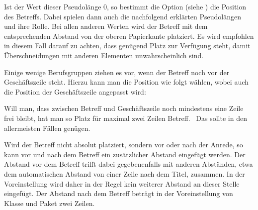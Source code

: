 \begin{Declaration}
\end{Declaration}
%
Ist der Wert dieser Pseudolänge 0, so bestimmt die
Option
%
 (siehe
) die
Position des Betreffs. Dabei spielen dann auch die nachfolgend erklärten
Pseudolängen  und  ihre
Rolle. Bei allen anderen Werten wird der Betreff mit dem entsprechenden
Abstand von der oberen Papierkante platziert. Es wird
empfohlen in diesem Fall darauf zu achten, dass genügend Platz zur Verfügung
steht, damit Überschneidungen mit anderen Elementen unwahrscheinlich sind.
\begin{Example}
  Einige wenige Berufsgruppen ziehen es vor, wenn der Betreff noch vor der
  Geschäftszeile steht. Hierzu kann man die Position wie folgt wählen, wobei
  auch die Position der Geschäftszeile angepasst wird:
  Will man, dass zwischen Betreff und Geschäftszeile noch mindestens eine
  Zeile frei bleibt, hat man so Platz für maximal zwei Zeilen Betreff.%
  \iftrue %
  \ Das sollte in den allermeisten Fällen genügen.%
  \fi%
\end{Example}
\EndIndexGroup
\ExampleEndFix


\begin{Declaration}
\end{Declaration}
%
Wird der Betreff nicht absolut platziert, sondern vor oder nach der Anrede, so
kann vor und nach dem Betreff ein zusätzlicher Abstand eingefügt werden. Der
Abstand vor dem Betreff trifft dabei gegebenenfalls mit anderen Abständen,
etwa dem automatischen Abstand von einer Zeile nach dem Titel, zusammen. In
der Voreinstellung wird daher in der Regel kein
weiterer Abstand an dieser Stelle eingefügt. Der Abstand nach dem Betreff
beträgt in der Voreinstellung von Klasse und Paket zwei Zeilen.%
\EndIndexGroup
%
\EndIndexGroup


